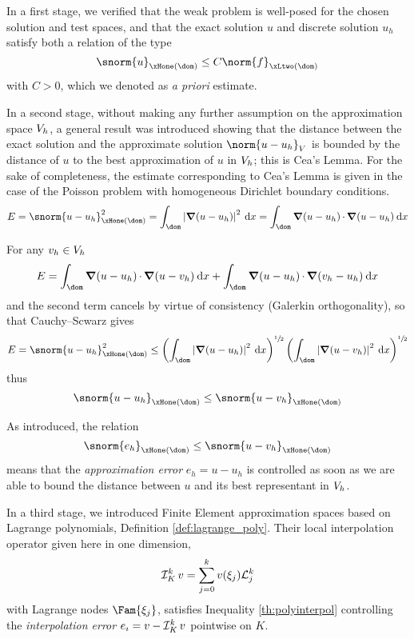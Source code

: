 \medskip
In a first stage, we verified that the weak problem is well-posed for the chosen solution and test spaces, and that the exact solution $u$ and discrete solution $u_h$ satisfy both a relation of the type
\begin{equation*}
\snorm{u}_{\xHone(\dom)} \leq C \norm{f}_{\xLtwo(\dom)}
\end{equation*}
with $C > 0$, which we denoted as \textit{a priori} estimate.

\medskip
In a second stage, without making any further assumption on the approximation space ${{V}}_h$, a general result was introduced showing that the distance between the exact solution and the approximate solution $\norm{u - u_h}_{\xV}$ is bounded by the distance of $u$ to the best approximation of $u$ in ${{V}}_h$; this is Cea's Lemma.
For the sake of completeness, the estimate corresponding to Cea's Lemma is given in the case of the Poisson problem with homogeneous Dirichlet boundary conditions.
\begin{equation*}
E = \snorm{u - u_h}^2_{\xHone(\dom)} = \int_\dom \Abs{\Grad(u - u_h)}^2\md x = \int_\dom \Grad(u - u_h)\xDot\Grad(u - u_h) \md x
\end{equation*}

For any $v_h\in{{V}}_h$
\begin{equation*}
E = \int_\dom \Grad(u - u_h)\xDot\Grad(u - v_h) \md x + \int_\dom \Grad(u - u_h)\xDot\Grad(v_h - u_h) \md x
\end{equation*}
and the second term cancels by virtue of consistency (Galerkin orthogonality), so that Cauchy--Scwarz gives
\begin{equation*}
E = \snorm{u - u_h}^2_{\xHone(\dom)} \leq \left(\int_\dom \Abs{\Grad(u - u_h)}^2 \md x\right)^{\sfrac{1}{2}} \left(\int_\dom \Abs{\Grad(u - v_h)}^2 \md x\right)^{\sfrac{1}{2}}
\end{equation*}
thus
\begin{equation*}
\snorm{u - u_h}_{\xHone(\dom)} \leq \snorm{u - v_h}_{\xHone(\dom)}
\end{equation*}


As introduced, the relation
\begin{equation}\label{eq:error_estimate_h1}
\snorm{e_h}_{\xHone(\dom)} \leq \snorm{u - v_h}_{\xHone(\dom)}
\end{equation}
means that the \textit{approximation error} $e_h = u - u_h$ is controlled as soon as we are able to bound the distance between $u$ and its best representant in ${{V}}_h$.

\medskip
In a third stage, we introduced Finite Element approximation spaces based on Lagrange polynomials, Definition \ref{def:lagrange_poly}.
Their local interpolation operator given here in one dimension,
\begin{equation*}
\mathop{\mathcal{I}_{K}^{k}} v = \sum_{j=0}^k v(\xi_j) \mathcal L^{k}_{j}
\end{equation*}
with Lagrange nodes $\Fam{\xi_j}$, satisfies Inequality \eqref{th:polyinterpol} controlling the \textit{interpolation error} $e_\imath = v - \mathop{\mathcal{I}_{K}^{k}} v$ pointwise on $K$.

